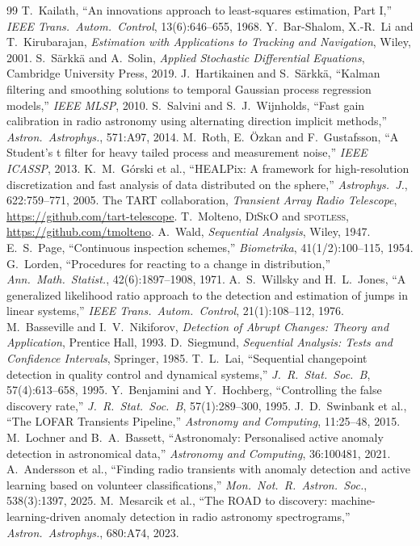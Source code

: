 \documentclass[11pt]{article}
\begin{document}
\begin{thebibliography}{99}
\small
{} T.~Kailath, ``An innovations approach to least-squares estimation, Part I,'' \emph{IEEE Trans.\ Autom.\ Control}, 13(6):646--655, 1968.
 Y.~Bar-Shalom, X.-R.~Li and T.~Kirubarajan, \emph{Estimation with Applications to Tracking and Navigation}, Wiley, 2001.
 S.~S\"arkk\"a and A.~Solin, \emph{Applied Stochastic Differential Equations}, Cambridge University Press, 2019.
 J.~Hartikainen and S.~S\"arkk\"a, ``Kalman filtering and smoothing solutions to temporal Gaussian process regression models,'' \emph{IEEE MLSP}, 2010.
 S.~Salvini and S.~J.~Wijnholds, ``Fast gain calibration in radio astronomy using alternating direction implicit methods,'' \emph{Astron.\ Astrophys.}, 571:A97, 2014.
 M.~Roth, E.~\"Ozkan and F.~Gustafsson, ``A Student's t filter for heavy tailed process and measurement noise,'' \emph{IEEE ICASSP}, 2013.
 K.~M.~G\'orski et al., ``HEALPix: A framework for high-resolution discretization and fast analysis of data distributed on the sphere,'' \emph{Astrophys.\ J.}, 622:759--771, 2005.
 The TART collaboration, \emph{Transient Array Radio Telescope}, \url{https://github.com/tart-telescope}.
 T.~Molteno, \textsc{DiSkO} and \textsc{spotless}, \url{https://github.com/tmolteno}.
 A.~Wald, \emph{Sequential Analysis}, Wiley, 1947.
 E.~S.~Page, ``Continuous inspection schemes,'' \emph{Biometrika}, 41(1/2):100--115, 1954.
 G.~Lorden, ``Procedures for reacting to a change in distribution,'' \emph{Ann.\ Math.\ Statist.}, 42(6):1897--1908, 1971.
 A.~S.~Willsky and H.~L.~Jones, ``A generalized likelihood ratio approach to the detection and estimation of jumps in linear systems,'' \emph{IEEE Trans.\ Autom.\ Control}, 21(1):108--112, 1976.
 M.~Basseville and I.~V.~Nikiforov, \emph{Detection of Abrupt Changes: Theory and Application}, Prentice Hall, 1993.
 D.~Siegmund, \emph{Sequential Analysis: Tests and Confidence Intervals}, Springer, 1985.
 T.~L.~Lai, ``Sequential changepoint detection in quality control and dynamical systems,'' \emph{J.\ R.\ Stat.\ Soc.\ B}, 57(4):613--658, 1995.
 Y.~Benjamini and Y.~Hochberg, ``Controlling the false discovery rate,'' \emph{J.\ R.\ Stat.\ Soc.\ B}, 57(1):289--300, 1995.
 J.~D.~Swinbank et al., ``The LOFAR Transients Pipeline,'' \emph{Astronomy and Computing}, 11:25--48, 2015.
 M.~Lochner and B.~A.~Bassett, ``Astronomaly: Personalised active anomaly detection in astronomical data,'' \emph{Astronomy and Computing}, 36:100481, 2021.
 A.~Andersson et al., ``Finding radio transients with anomaly detection and active learning based on volunteer classifications,'' \emph{Mon.\ Not.\ R.\ Astron.\ Soc.}, 538(3):1397, 2025.
 M.~Mesarcik et al., ``The ROAD to discovery: machine-learning-driven anomaly detection in radio astronomy spectrograms,'' \emph{Astron.\ Astrophys.}, 680:A74, 2023.
\end{thebibliography}
\end{document}
